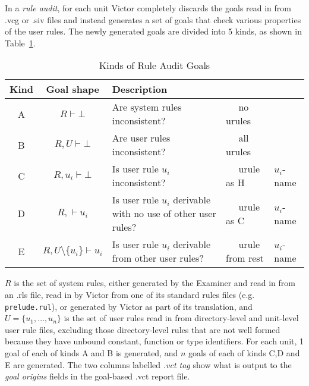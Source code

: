 \documentclass[12pt,fleqn]{article}
\begin{document}
In a \emph{rule audit}, for each unit Victor completely discards the
goals read in from .vcg or .siv files and instead generates a set of goals
that check various properties of the user rules.  
%
The newly generated goals are divided into 5 kinds, as shown in
Table~{\ref{tab:audit-goal-kinds}}.
\begin{table}[htb]
  \newcommand{\uiname}{$u_i$-name}
  \centering
  \begin{tabular}{ccp{6cm}>{\ttfamily\ \ }ll}
    Kind   &    Goal shape  &  Description  &  \multicolumn{2}{c}{.vct tag} \\
    \hline
    A      &  $R \vdash \bot$ 
                      &  Are system rules inconsistent?
                                      & \ttfamily no urules  \\
    B      &  $R, U \vdash \bot$
                      &  Are user rules inconsistent?
                                      & all urules  \\
    C      &  $R, u_i \vdash \bot$
                      &  Is user rule $u_i$ inconsistent?
                                      & urule as H     & \uiname \\
    D      &  $R, \vdash u_i$
                      &  Is user rule $u_i$ derivable with no use of
                         other user rules?
                                      & urule as C   & \uiname \\
    E      &  $R, U\setminus\{u_i\} \vdash u_i$
                      &  Is user rule $u_i$ derivable from 
                         other user rules?
                         & urule from rest   & \uiname\\
  \hline
  \end{tabular}
  \caption{Kinds of Rule Audit Goals}
  \label{tab:audit-goal-kinds}
\end{table}

$R$ is the set of system rules, either generated by the Examiner
and read in from an .rls file, read in by Victor from one of its
standard rules files (e.g. \texttt{prelude.rul}), or generated by
Victor as part of its translation, 
%
and $U = \{u_1, \ldots, u_n\}$ is the set of user rules read in from
directory-level and unit-level user rule files, excluding those directory-level
rules that are not well formed because they have unbound constant, function or type identifiers.
%
For each unit, 1 goal of each of kinds A and B is generated, and $n$
goals of each of kinds C,D and E are generated.
%
The two columns labelled \emph{.vct tag} show what is output to the
\emph{goal origins} fields in the goal-based .vct report file.
\end{document}
